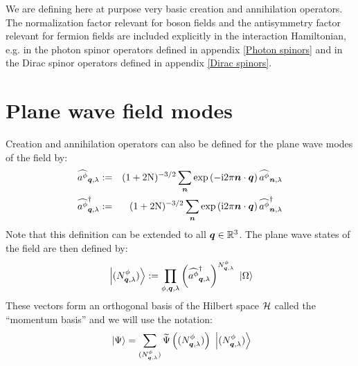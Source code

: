 \documentclass[10pt,a4paper,twoside,openany]{book}
\begin{document}
 We are defining here at purpose very basic creation and annihilation operators. The normalization factor relevant for boson fields and the antisymmetry factor relevant for fermion fields are included explicitly in the interaction Hamiltonian, e.g. in the photon spinor operators defined in appendix \ref{Photon spinors} and in the Dirac spinor operators defined in appendix \ref{Dirac spinors}.

\section{Plane wave field modes}

 Creation and annihilation operators can also be defined for the plane wave modes of the field by:
\begin{eqnarray*}
\widehat{a^{\phi}}_{{\boldsymbol{q}}, {\lambda}} & := & (1+2 \mathrm N)^{-3/2} \sum_{\boldsymbol{n}} \mathrm{exp} \left( {-\mathrm{i} 2 \pi \boldsymbol{n} \cdot \boldsymbol{q}} \right) \widehat{a^{\phi}}_{{\boldsymbol{n}}, {\lambda}} \\
\widehat{a^{\phi}}^{\dagger}_{{\boldsymbol{q}}, {\lambda}} & := & (1+2 \mathrm N)^{-3/2} \sum_{\boldsymbol{n}} \mathrm{exp} \left( {\mathrm{i} 2 \pi \boldsymbol{n} \cdot \boldsymbol{q}} \right) \widehat{a^{\phi}}^{\dagger}_{{\boldsymbol{n}}, {\lambda}}
\end{eqnarray*}
Note that this definition can be extended to all $\boldsymbol{q} \in \mathbb{R}^3$. The plane wave states of the field are then defined by:
\begin{equation*}
\ \left|{({N}^{\phi}_{{\boldsymbol{q}}, {\lambda}})}\right\rangle := \prod_{\phi,\boldsymbol{q},\lambda} \left( \widehat{a^{\phi}}^{\dagger}_{{\boldsymbol{q}}, {\lambda}} \right)^{{N}^{\phi}_{{\boldsymbol{q}}, {\lambda}}} \ \left|{\Omega}\right\rangle
\end{equation*}
These vectors form an orthogonal basis of the Hilbert space $\mathcal H$ called the ``momentum basis'' and we will use the notation:
\begin{equation*}
\ \left|{\Psi}\right\rangle = \sum_{({N}^{\phi}_{{\boldsymbol{q}}, {\lambda}})} \widetilde{\Psi} \left( ({N}^{\phi}_{{\boldsymbol{q}}, {\lambda}}) \right) \ \left|{({N}^{\phi}_{{\boldsymbol{q}}, {\lambda}})}\right\rangle
\end{equation*}
\end{document}
